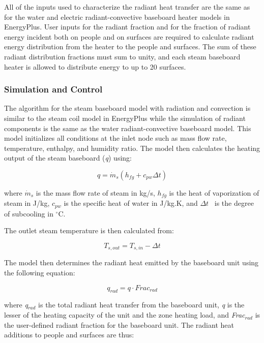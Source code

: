 All of the inputs used to characterize the radiant heat transfer are the same as for the water and electric radiant-convective baseboard heater models in EnergyPlus. User inputs for the radiant fraction and for the fraction of radiant energy incident both on people and on surfaces are required to calculate radiant energy distribution from the heater to the people and surfaces. The sum of these radiant distribution fractions must sum to unity, and each steam baseboard heater is allowed to distribute energy to up to 20 surfaces.

\subsubsection{Simulation and Control}\label{simulation-and-control-1-001}

The algorithm for the steam baseboard model with radiation and convection is similar to the steam coil model in EnergyPlus while the simulation of radiant components is the same as the water radiant-convective baseboard model. This model initializes all conditions at the inlet node such as mass flow rate, temperature, enthalpy, and humidity ratio. The model then calculates the heating output of the steam baseboard (\emph{q}) using:

\begin{equation}
q = {\dot m_s}({h_{fg}} + {c_{pw}}\Delta t)
\end{equation}

where \({\dot m_s}\) is the mass flow rate of steam in kg/s, \({h_{fg}}\) is the heat of vaporization of steam in J/kg, \({c_{pw}}\) is the specific heat of water in J/kg.K, and \(\Delta t\) ~is the degree of subcooling in \(^{\circ}\)C.

The outlet steam temperature is then calculated from:

\begin{equation}
{T_{s,out}} = {T_{s,in}} - \Delta t
\end{equation}

The model then determines the radiant heat emitted by the baseboard unit using the following equation:

\begin{equation}
{q_{rad}} = q \cdot Fra{c_{rad}}
\end{equation}

where \emph{q\(_{rad}\)} is the total radiant heat transfer from the baseboard unit, \emph{q} is the lesser of the heating capacity of the unit and the zone heating load, and \emph{Frac\(_{rad}\)} is the user-defined radiant fraction for the baseboard unit. The radiant heat additions to people and surfaces are thus:

